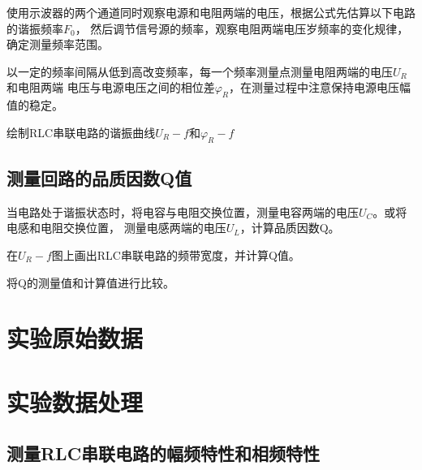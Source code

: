 \documentclass{ctexart}
\begin{document}
   使用示波器的两个通道同时观察电源和电阻两端的电压，根据公式先估算以下电路的谐振频率$F_{0}$，
              然后调节信号源的频率，观察电阻两端电压岁频率的变化规律，确定测量频率范围。

   以一定的频率间隔从低到高改变频率，每一个频率测量点测量电阻两端的电压$U_{R}$和电阻两端
              电压与电源电压之间的相位差$\varphi_{R}$，在测量过程中注意保持电源电压幅值的稳定。

   绘制RLC串联电路的谐振曲线$U_{R}-f\mbox{和}\varphi_{R}-f$

  \subsection{测量回路的品质因数Q值}
   当电路处于谐振状态时，将电容与电阻交换位置，测量电容两端的电压$U_{C}$。或将电感和电阻交换位置，
              测量电感两端的电压$U_{L}$，计算品质因数Q。

   在$U_{R}-f$图上画出RLC串联电路的频带宽度，并计算Q值。

   将Q的测量值和计算值进行比较。
\newpage

\section{实验原始数据}
\newpage

\section{实验数据处理}
  \subsection{测量RLC串联电路的幅频特性和相频特性}


\end{document}

